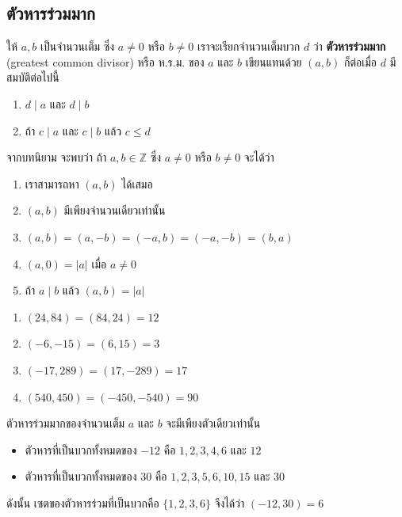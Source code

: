 \newpage
\subsection{ตัวหารร่วมมาก}
\begin{definitionbox}
	ให้ $a, b$ เป็นจำนวนเต็ม ซึ่ง $a \neq 0$ หรือ $b \neq 0$ เราจะเรียกจำนวนเต็มบวก $d$ ว่า \textbf{ตัวหารร่วมมาก} (greatest common divisor) หรือ ห.ร.ม. ของ $a$ และ $b$ เขียนแทนด้วย $(a, b)$ ก็ต่อเมื่อ $d$ มีสมบัติต่อไปนี้
	\begin{enumerate}
		\item $d \mid a$ และ $d \mid b$
		\item ถ้า $c \mid a$ และ $c \mid b$ แล้ว $c \leq d$
	\end{enumerate}
\end{definitionbox}

\noindent จากบทนิยาม จะพบว่า ถ้า $a, b \in \mathbb{Z}$ ซึ่ง $a \neq 0$ หรือ $b \neq 0$ จะได้ว่า
\begin{enumerate}
	\item เราสามารถหา $(a, b)$ ได้เสมอ
	\item $(a, b)$ มีเพียงจำนวนเดียวเท่านั้น
	\item $(a, b) = (a, -b) = (-a, b) = (-a, -b) = (b, a)$
	\item $(a, 0) = |a|$ เมื่อ $a \neq 0$
	\item ถ้า $a \mid b$ แล้ว $(a, b) = |a|$
\end{enumerate}

\begin{examplebox}
	\begin{enumerate}
		\item $(24, 84) = (84, 24) = 12$
		\item $(-6, -15) = (6, 15) = 3$
		\item $(-17, 289) = (17, -289) = 17$
		\item $(540, 450) = (-450, -540) = 90$
	\end{enumerate}
\end{examplebox}

\begin{theorembox}
ตัวหารร่วมมากของจำนวนเต็ม $a$ และ $b$ จะมีเพียงตัวเดียวเท่านั้น
\end{theorembox}

\begin{examplebox}
\begin{itemize}
	\item ตัวหารที่เป็นบวกทั้งหมดของ $-12$ คือ $1, 2, 3, 4, 6$ และ $12$
	\item ตัวหารที่เป็นบวกทั้งหมดของ $30$ คือ $1, 2, 3, 5, 6, 10, 15$ และ $30$
\end{itemize}
	ดังนั้น เซตของตัวหารร่วมที่เป็นบวกคือ $\{1, 2, 3, 6\}$ จึงได้ว่า $(-12, 30) = 6$
\end{examplebox}

